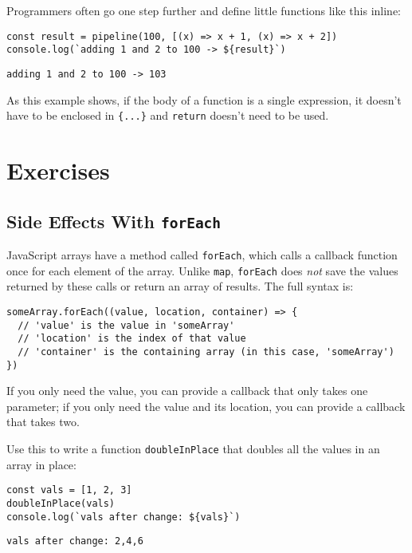 Programmers often go one step further and define little functions like this inline:

\begin{verbatim}
const result = pipeline(100, [(x) => x + 1, (x) => x + 2])
console.log(`adding 1 and 2 to 100 -> ${result}`)
\end{verbatim}

\begin{verbatim}
adding 1 and 2 to 100 -> 103
\end{verbatim}

As this example shows,
if the body of a function is a single expression,
it doesn't have to be enclosed in \texttt{\{...\}} and \texttt{return} doesn't need to be used.

\section{Exercises}\label{s:callbacks-exercises}

\subsection*{Side Effects With \texttt{forEach}}
JavaScript arrays have a method called \texttt{forEach},
which calls a callback function once for each element of the array.
Unlike \texttt{map},
\texttt{forEach} does \emph{not} save the values returned by these calls
or return an array of results.
The full syntax is:

\begin{verbatim}
someArray.forEach((value, location, container) => {
  // 'value' is the value in 'someArray'
  // 'location' is the index of that value
  // 'container' is the containing array (in this case, 'someArray')
})
\end{verbatim}

If you only need the value,
you can provide a callback that only takes one parameter;
if you only need the value and its location,
you can provide a callback that takes two.

Use this to write a function \texttt{doubleInPlace}
that doubles all the values in an array in place:

\begin{verbatim}
const vals = [1, 2, 3]
doubleInPlace(vals)
console.log(`vals after change: ${vals}`)
\end{verbatim}

\begin{verbatim}
vals after change: 2,4,6
\end{verbatim}

